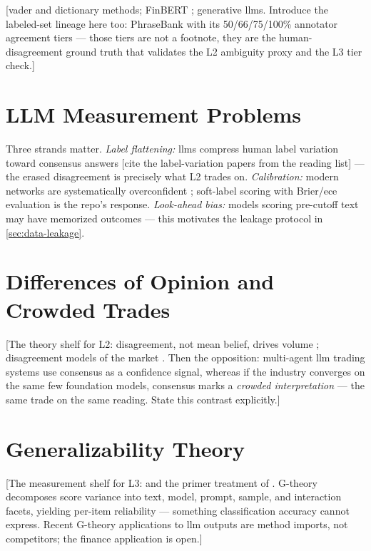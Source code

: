 [\gls{vader} \parencite{hutto2014vader} and dictionary methods;
FinBERT \parencite{araci2019finbert}; generative \glspl{llm}.
Introduce the labeled-set lineage here too: PhraseBank
\parencite{malo2014phrasebank} with its 50/66/75/100\% annotator
agreement tiers --- those tiers are not a footnote, they are the
human-disagreement ground truth that validates the L2 ambiguity proxy
and the L3 tier check.]

\section{LLM Measurement Problems}
\label{sec:lit-llm-measurement}

Three strands matter. \emph{Label flattening:} \glspl{llm} compress
human label variation toward consensus answers [cite the
label-variation papers from the reading list] --- the erased
disagreement is precisely what L2 trades on. \emph{Calibration:}
modern networks are systematically overconfident
\parencite{guo2017calibration}; soft-label scoring with Brier/\gls{ece}
evaluation is the repo's response. \emph{Look-ahead bias:} models
scoring pre-cutoff text may have memorized outcomes
\parencite{glasserman2023lookahead, gao2025lookahead} --- this
motivates the leakage protocol in \cref{sec:data-leakage}.

\section{Differences of Opinion and Crowded Trades}
\label{sec:lit-disagreement}

[The theory shelf for L2: disagreement, not mean belief, drives volume
\parencite{harris1993differences, kandel1995differential}; disagreement
models of the market \parencite{hong2007disagreement}. Then the
opposition: multi-agent \gls{llm} trading systems use consensus as a
confidence signal, whereas if the industry converges on the same few
foundation models, consensus marks a \emph{crowded interpretation} ---
the same trade on the same reading. State this contrast explicitly.]

\section{Generalizability Theory}
\label{sec:lit-gtheory}

[The measurement shelf for L3: \textcite{cronbach1972} and the primer
treatment of \textcite{shavelson1991}. G-theory decomposes score
variance into text, model, prompt, sample, and interaction facets,
yielding per-item reliability --- something classification accuracy
cannot express. Recent G-theory applications to \gls{llm} outputs are
method imports, not competitors; the finance application is open.]

